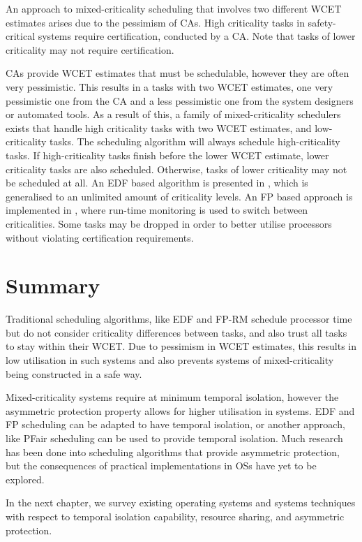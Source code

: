 An approach to mixed-criticality scheduling that involves two different WCET estimates arises due to the pessimism of \glspl{CA}.
High criticality tasks in safety-critical systems require certification, conducted by a \gls{CA}.
Note that tasks of lower criticality may not require certification.

\Glspl{CA} provide {\gls{WCET}} estimates that must be schedulable, however they are often very pessimistic.
This results in a tasks with two {\gls{WCET}} estimates, one very pessimistic one from the \gls{CA} and a less pessimistic one from the system designers or automated tools.
As a result of this, a family of mixed-criticality schedulers exists that handle high criticality tasks with two {\gls{WCET}} estimates, and low-criticality tasks.
The scheduling algorithm will always schedule high-criticality tasks.
If high-criticality tasks finish before the lower \gls{WCET} estimate, lower criticality tasks are also scheduled.
Otherwise, tasks of lower criticality may not be scheduled at all.
An \gls{EDF} based algorithm is presented in \citet{Baruah_BDMVS_2011}, which is generalised to an unlimited amount of criticality levels.
An \gls{FP} based approach is implemented in \citet{Pathan:phd}, where run-time monitoring is used to switch between criticalities.
Some tasks may be dropped in order to better utilise processors without violating certification requirements.


\section{Summary}


Traditional scheduling algorithms, like \gls{EDF} and \gls{FP}-\gls{RM} schedule processor time but do not consider criticality differences between tasks, and also trust all tasks to stay within their \gls{WCET}.
Due to pessimism in \gls{WCET} estimates, this results in low utilisation in such systems and also prevents systems of mixed-criticality being constructed in a safe way.

Mixed-criticality systems require at minimum temporal isolation, however the asymmetric protection property allows for higher utilisation in systems.
\gls{EDF} and \gls{FP} scheduling can be adapted to have temporal isolation, or another approach, like PFair scheduling can be used to provide temporal isolation.
Much research has been done into scheduling algorithms that provide asymmetric protection, but the consequences of practical implementations in \glspl{OS} have yet to be explored.

In the next chapter, we survey existing operating systems and systems techniques with respect to temporal isolation capability, resource sharing, and asymmetric protection.

